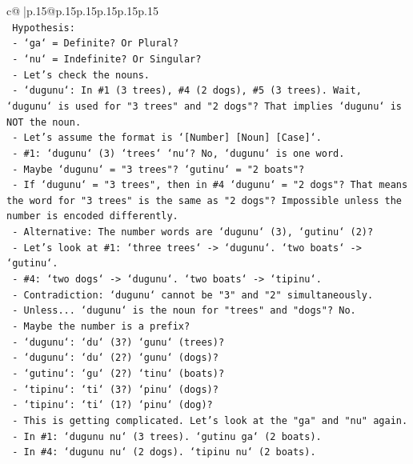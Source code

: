 \documentclass{article}
\begin{document}
{\begin{supertabular}{c@{$\;$}|p{.15\linewidth}@{}p{.15\linewidth}p{.15\linewidth}p{.15\linewidth}p{.15\linewidth}p{.15\linewidth}}
{{{\\ 
\texttt{   Hypothesis:} \\
\texttt{   {-} `ga` = Definite? Or Plural?} \\
\texttt{   {-} `nu` = Indefinite? Or Singular?} \\
\texttt{   {-} Let's check the nouns.} \\
\texttt{   {-} `dugunu`: In \#1 (3 trees), \#4 (2 dogs), \#5 (3 trees). Wait, `dugunu` is used for "3 trees" and "2 dogs"? That implies `dugunu` is NOT the noun.} \\
\texttt{   {-} Let's assume the format is `{[}Number{]} {[}Noun{]} {[}Case{]}`.} \\
\texttt{   {-} \#1: `dugunu` (3) `trees` `nu`? No, `dugunu` is one word.} \\
\texttt{   {-} Maybe `dugunu` = "3 trees"? `gutinu` = "2 boats"?} \\
\texttt{   {-} If `dugunu` = "3 trees", then in \#4 `dugunu` = "2 dogs"? That means the word for "3 trees" is the same as "2 dogs"? Impossible unless the number is encoded differently.} \\
\texttt{   {-} Alternative: The number words are `dugunu` (3), `gutinu` (2)?} \\
\texttt{   {-} Let's look at \#1: `three trees` {-}> `dugunu`. `two boats` {-}> `gutinu`.} \\
\texttt{   {-} \#4: `two dogs` {-}> `dugunu`. `two boats` {-}> `tipinu`.} \\
\texttt{   {-} Contradiction: `dugunu` cannot be "3" and "2" simultaneously.} \\
\texttt{   {-} Unless... `dugunu` is the noun for "trees" and "dogs"? No.} \\
\texttt{   {-} Maybe the number is a prefix?} \\
\texttt{   {-} `dugunu`: `du` (3?) `gunu` (trees)?} \\
\texttt{   {-} `dugunu`: `du` (2?) `gunu` (dogs)?} \\
\texttt{   {-} `gutinu`: `gu` (2?) `tinu` (boats)?} \\
\texttt{   {-} `tipinu`: `ti` (3?) `pinu` (dogs)?} \\
\texttt{   {-} `tipinu`: `ti` (1?) `pinu` (dog)?} \\
\texttt{   {-} This is getting complicated. Let's look at the "ga" and "nu" again.} \\
\texttt{   {-} In \#1: `dugunu nu` (3 trees). `gutinu ga` (2 boats).} \\
\texttt{   {-} In \#4: `dugunu nu` (2 dogs). `tipinu nu` (2 boats).} \\
}}}
\end{supertabular}}
\end{document}
